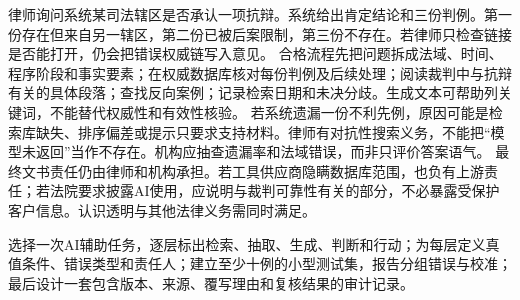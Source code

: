 律师询问系统某司法辖区是否承认一项抗辩。系统给出肯定结论和三份判例。第一份存在但来自另一辖区，第二份已被后案限制，第三份不存在。若律师只检查链接是否能打开，仍会把错误权威链写入意见。 合格流程先把问题拆成法域、时间、程序阶段和事实要素；在权威数据库核对每份判例及后续处理；阅读裁判中与抗辩有关的具体段落；查找反向案例；记录检索日期和未决分歧。生成文本可帮助列关键词，不能替代权威性和有效性核验。 若系统遗漏一份不利先例，原因可能是检索库缺失、排序偏差或提示只要求支持材料。律师有对抗性搜索义务，不能把“模型未返回”当作不存在。机构应抽查遗漏率和法域错误，而非只评价答案语气。 最终文书责任仍由律师和机构承担。若工具供应商隐瞒数据库范围，也负有上游责任；若法院要求披露AI使用，应说明与裁判可靠性有关的部分，不必暴露受保护客户信息。认识透明与其他法律义务需同时满足。

\begin{tcolorbox}[breakable,colback=white,colframe=blue!30!black,title={本章研读任务},fonttitle=\bfseries]
选择一次AI辅助任务，逐层标出检索、抽取、生成、判断和行动；为每层定义真值条件、错误类型和责任人；建立至少十例的小型测试集，报告分组错误与校准；最后设计一套包含版本、来源、覆写理由和复核结果的审计记录。
\end{tcolorbox}
